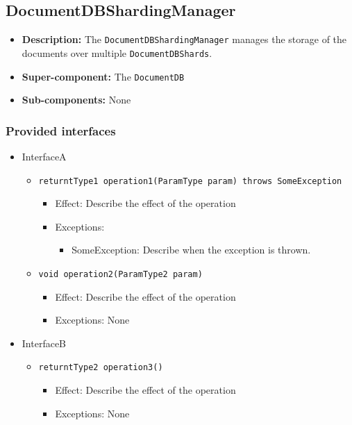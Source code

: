 \documentclass[a4paper,10pt]{article}
\begin{document}
\subsection{DocumentDBShardingManager}
\begin{itemize}
    \item \textbf{Description:} The \texttt{DocumentDBShardingManager} manages the storage of the documents over multiple \texttt{DocumentDBShards}.
    \item \textbf{Super-component:} The \texttt{DocumentDB}
    \item \textbf{Sub-components:} None
\end{itemize}

\subsubsection*{Provided interfaces}
\begin{itemize}
    \item InterfaceA
    \begin{itemize}
        \item \texttt{returntType1 operation1(ParamType param) throws SomeException}
        \begin{itemize}
            \item Effect: Describe the effect of the operation
            \item Exceptions:
            \begin{itemize}
                \item SomeException: Describe when the exception is thrown.
            \end{itemize}
		\end{itemize}
        \item \texttt{void operation2(ParamType2 param)}
        \begin{itemize}
            \item Effect: Describe the effect of the operation
            \item Exceptions: None
        \end{itemize}
    \end{itemize}

    \item InterfaceB
    \begin{itemize}
        \item \texttt{returntType2 operation3()}
        \begin{itemize}
            \item Effect: Describe the effect of the operation
            \item Exceptions: None
        \end{itemize}
    \end{itemize}
\end{itemize}
\end{document}
